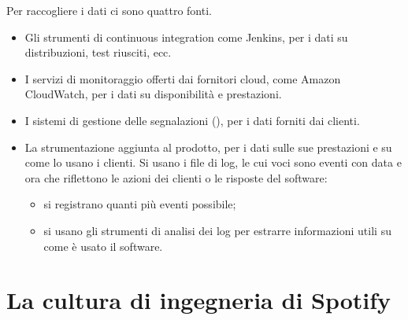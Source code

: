 Per raccogliere i dati ci sono quattro fonti.
\begin{itemize}
  \item Gli strumenti di continuous integration come Jenkins, per i dati su distribuzioni, test riusciti, ecc.
  \item I servizi di monitoraggio offerti dai fornitori cloud, come Amazon CloudWatch, per i dati su disponibilità e
    prestazioni.
  \item I sistemi di gestione delle segnalazioni (), per i dati forniti dai clienti.
  \item La strumentazione aggiunta al prodotto, per i dati sulle sue prestazioni e su come lo usano i clienti. Si
    usano i file di log, le cui voci sono eventi con data e ora che riflettono le azioni dei clienti o le risposte del
    software:
    \begin{itemize}
      \item si registrano quanti più eventi possibile;
      \item si usano gli strumenti di analisi dei log per estrarre informazioni utili su come è usato il software.
    \end{itemize}
\end{itemize}

\section{La cultura di ingegneria di Spotify}
\label{sec:devops-spotify}

